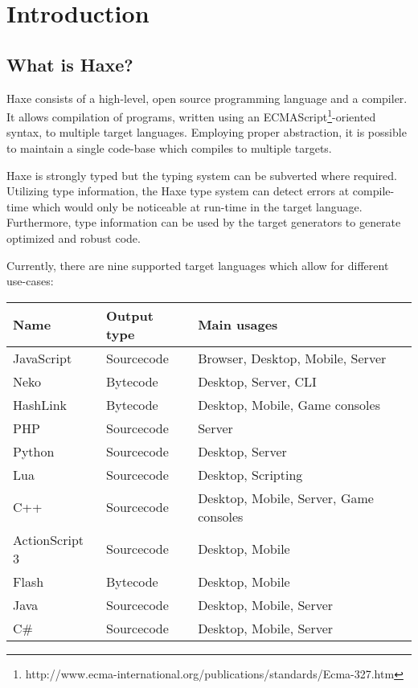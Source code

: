 \chapter{Introduction}
\label{introduction}

\section{What is Haxe?}
\label{introduction-what-is-haxe}


Haxe consists of a high-level, open source programming language and a compiler. It allows compilation of programs, written using an ECMAScript\footnote{http://www.ecma-international.org/publications/standards/Ecma-327.htm}-oriented syntax, to multiple target languages. Employing proper abstraction, it is possible to maintain a single code-base which compiles to multiple targets.

Haxe is strongly typed but the typing system can be subverted where required. Utilizing type information, the Haxe type system can detect errors at compile-time which would only be noticeable at run-time in the target language. Furthermore, type information can be used by the target generators to generate optimized and robust code.

Currently, there are nine supported target languages which allow for different use-cases:

\begin{center}
\begin{tabular}{| l | l | l |}
	\hline
	Name & Output type & Main usages \\ \hline
	JavaScript & Sourcecode & Browser, Desktop, Mobile, Server \\
	Neko & Bytecode & Desktop, Server, CLI \\
	HashLink & Bytecode & Desktop, Mobile, Game consoles \\
	PHP & Sourcecode & Server \\
	Python & Sourcecode & Desktop, Server \\
	Lua & Sourcecode & Desktop, Scripting \\
	C++ & Sourcecode & Desktop, Mobile, Server, Game consoles \\
	ActionScript 3 & Sourcecode & Desktop, Mobile \\
	Flash & Bytecode & Desktop, Mobile \\ 
	Java & Sourcecode & Desktop, Mobile, Server \\
	C\# & Sourcecode & Desktop, Mobile, Server \\ \hline
\end{tabular}
\end{center}

